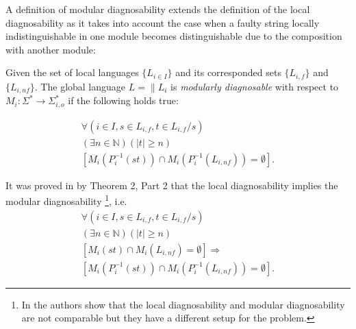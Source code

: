 \documentclass[a4paper, 10pt, conference]{ieeeconf}
\begin{document}
A definition of modular diagnosability extends the definition of the local
diagnosability as it takes into account the case when a faulty string locally
indistinguishable in one module becomes distinguishable due to the
composition with another module:

\begin{definition} Given the set of local languages
$\{L_{i \in I}\}$ and its corresponded sets $\{L_{i,f}\}$ and
$\{L_{i,nf}\}$. The global language $L = \parallel L_i$ is \emph{modularly
diagnosable} with respect to
$M_i: \Sigma^* \rightarrow \Sigma_{i,o}^*$ 
if the following holds true:
\end{definition}
\begin{equation}
\begin{array}{l}
	\forall(i \in I, s \in L_{i,f}, t \in L_{i,f}/s)
	\\
	(\exists n \in \mathbb{N})
	(|t| \geq n)
	\\
	\left[ M_i(P_i^{-1}(st)) \cap M_i(P_i^{-1}(L_{i,nf})) = \emptyset \right].
\end{array}
\end{equation}

It was proved in \cite{contant_diagnosability_2006} by Theorem 2, Part 2 
that the local diagnosability implies the modular diagnosability \footnote{In
\cite{zhou_decentralized_2008} the authors show that the local diagnosability
and modular diagnosability are not comparable but they have a different setup
for the problem.}, i.e.
\begin{equation}
\begin{array}{l}
	\forall(i \in I, s \in L_{i,f}, t \in L_{i,f}/s)
	\\
	(\exists n \in \mathbb{N})
	(|t| \geq n)
	\\
	\left[ M_i(st) \cap M_i(L_{i,nf}) = \emptyset \right]
	\Rightarrow \\ 
	\left[ M_i(P_i^{-1}(st)) \cap M_i(P_i^{-1}(L_{i,nf})) = \emptyset \right].
\end{array}
\end{equation}
\end{document}

